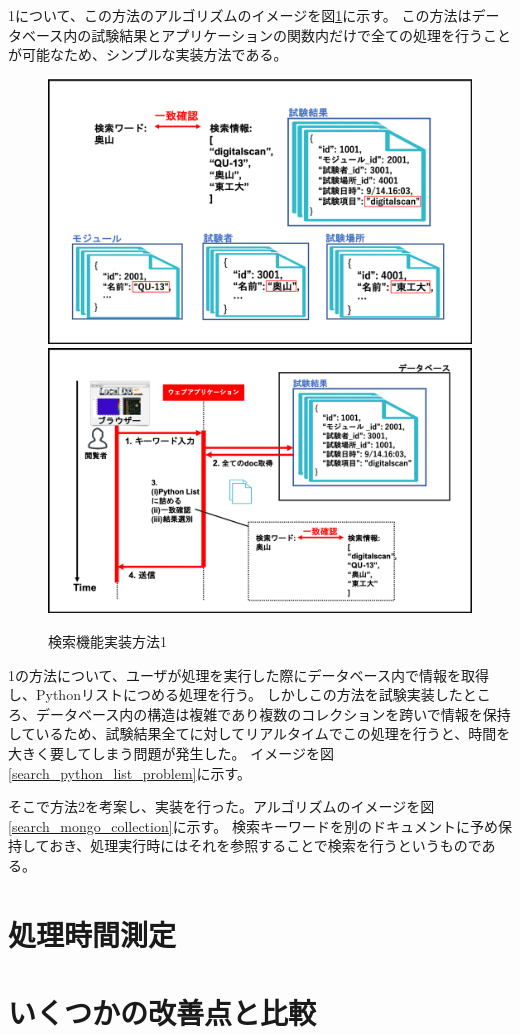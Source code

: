 1について、この方法のアルゴリズムのイメージを図\ref{search_python_list}に示す。
この方法はデータベース内の試験結果とアプリケーションの関数内だけで全ての処理を行うことが可能なため、シンプルな実装方法である。

\begin{figure}[bpt]
  \begin{center}
    \includegraphics[width=16cm]{search_python_list}
    \includegraphics[width=16cm]{search_python_list_flow}
  \caption[検索機能実装方法1]{検索機能実装方法1}
  \label{search_python_list}
  \end{center}
\end{figure}


1の方法について、ユーザが処理を実行した際にデータベース内で情報を取得し、Pythonリストにつめる処理を行う。
しかしこの方法を試験実装したところ、データベース内の構造は複雑であり複数のコレクションを跨いで情報を保持しているため、試験結果全てに対してリアルタイムでこの処理を行うと、時間を大きく要してしまう問題が発生した。
イメージを図\ref{search_python_list_problem}に示す。

そこで方法2を考案し、実装を行った。アルゴリズムのイメージを図\ref{search_mongo_collection}に示す。
検索キーワードを別のドキュメントに予め保持しておき、処理実行時にはそれを参照することで検索を行うというものである。


\section{処理時間測定}
 
\section{いくつかの改善点と比較}

